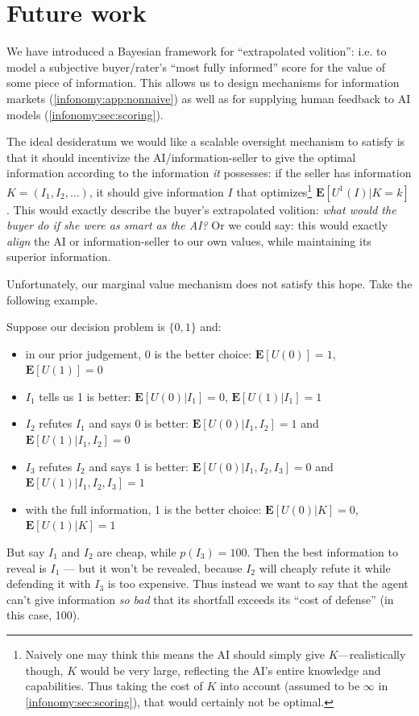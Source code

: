 \section{Future work}
\label{infonomy:sec:so}

We have introduced a Bayesian framework for ``extrapolated volition'': i.e. to model a subjective buyer/rater's ``most fully informed'' score for the value of some piece of information. This allows us to design mechanisms for information markets (\cref{infonomy:app:nonnaive}) as well as for supplying human feedback to AI models (\cref{infonomy:sec:scoring}).

The ideal desideratum we would like a scalable oversight mechanism to satisfy is that it should incentivize the AI/information-seller to give the optimal information according to the information \emph{it} possesses: if the seller has information $K=(I_1,I_2,\dots)$, it should give information $I$ that optimizes\footnote{Naively one may think this means the AI should simply give $K$---realistically though, $K$ would be very large, reflecting the AI's entire knowledge and capabilities. Thus taking the cost of $K$ into account (assumed to be $\infty$ in \cref{infonomy:sec:scoring}), that would certainly not be optimal.} $\mathbf{E}[U^1(I)|K=k]$. This would exactly describe the buyer's extrapolated volition: \emph{what would the buyer do if she were as smart as the AI?} Or we could say: this would exactly \emph{align} the AI or information-seller to our own values, while maintaining its superior information.

Unfortunately, our marginal value mechanism does not satisfy this hope. Take the following example.

\begin{example}
Suppose our decision problem is $\{0,1\}$ and:
\begin{itemize}
\item in our prior judgement, 0 is the better choice: $\mathbf{E}[U(0)]=1$, $\mathbf{E}[U(1)]=0$
\item  $I_1$ tells us 1 is better: $\mathbf{E}[U(0)|I_1]=0$, $\mathbf{E}[U(1)|I_1]=1$
\item  $I_2$ refutes $I_1$ and says 0 is better: $\mathbf{E}[U(0)|I_1,I_2]=1$ and $\mathbf{E}[U(1)|I_1,I_2]=0$
\item  $I_3$ refutes $I_2$ and says 1 is better: $\mathbf{E}[U(0)|I_1,I_2,I_3]=0$ and $\mathbf{E}[U(1)|I_1,I_2,I_3]=1$
\item with the full information, 1 is the better choice: $\mathbf{E}[U(0)|K]=0$, $\mathbf{E}[U(1)|K]=1$
\end{itemize}

But say $I_1$ and $I_2$ are cheap, while $p(I_3)=100$. Then the best information to reveal is $I_1$ --- but it won't be revealed, because $I_2$ will cheaply refute it while defending it with $I_3$ is too expensive. Thus instead we want to say that the agent can't give information \emph{so bad} that its shortfall exceeds its ``cost of defense'' (in this case, 100).

\end{example}

